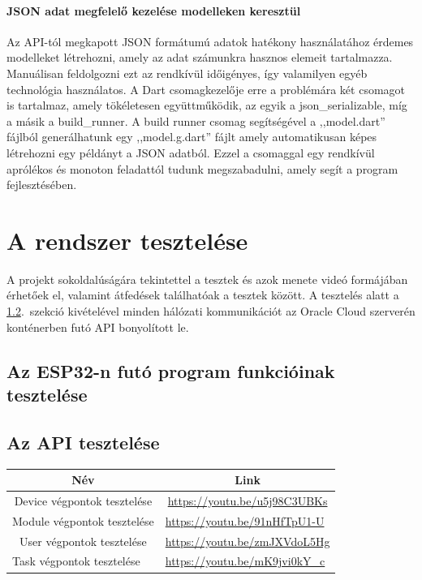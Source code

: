 \documentclass{thesis-ekf}
\theoremstyle{definition}
\theoremstyle{remark}
\begin{document}
	\subsubsection{JSON adat megfelelő kezelése modelleken keresztül}
	Az API-tól megkapott JSON formátumú adatok hatékony használatához érdemes modelleket létrehozni, amely az adat számunkra hasznos elemeit tartalmazza. Manuálisan feldolgozni ezt az rendkívül időigényes, így valamilyen egyéb technológia használatos. A Dart csomagkezelője erre a problémára két csomagot is tartalmaz, amely tökéletesen együttműködik, az egyik a json\_serializable\cite{bib_flutter_json_ser}, míg a másik a build\_runner\cite{bib_flutter_runner}. A build runner csomag segítségével a ,,model.dart'' fájlból generálhatunk egy ,,model.g.dart'' fájlt amely automatikusan képes létrehozni egy példányt a JSON adatból. Ezzel a csomaggal egy rendkívül aprólékos és monoton feladattól tudunk megszabadulni, amely segít a program fejlesztésében.
	 
	\chapter{A rendszer tesztelése}
	A projekt sokoldalúságára tekintettel a tesztek és azok menete videó formájában érhetőek el, valamint átfedések találhatóak a tesztek között. A tesztelés alatt a \ref{sec_API_test}.~szekció kivételével minden hálózati kommunikációt az Oracle Cloud szerverén konténerben futó API bonyolított le.
	\section{Az ESP32-n futó program funkcióinak tesztelése}
	\section{Az API tesztelése}
	\label{sec_API_test}
	\begin{table}[!ht]
		\centering
		\begin{tabular}{|c|l|}
			\hline
			\textbf{Név}             & \multicolumn{1}{c|}{\textbf{Link}} \\ \hline
			Device végpontok tesztelése                       & \multicolumn{1}{c|}{\url{https://youtu.be/u5j98C3UBKs}}            \\ \hline
			Module végpontok tesztelése                       & \url{https://youtu.be/91nHfTpU1-U}                                 \\ \hline
			User végpontok tesztelése                       & \url{https://youtu.be/zmJXVdoL5Hg}                                 \\ \hline
			\multicolumn{1}{|l|}{Task végpontok tesztelése} & \url{https://youtu.be/mK9jvi0kY_c}                                 \\ \hline
		\end{tabular}
	\end{table}
	\FloatBarrier
\end{document}
